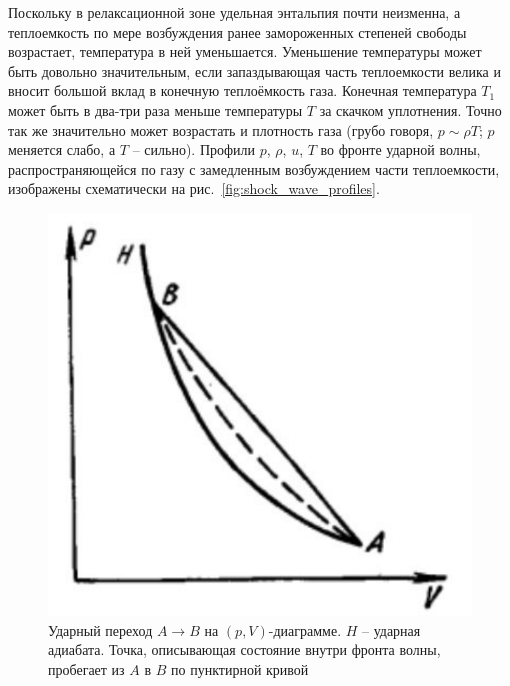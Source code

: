 \documentclass[10pt, a4paper]{article}
\begin{document}
Поскольку в релаксационной зоне удельная энтальпия почти неизменна, а теплоемкость по мере возбуждения ранее замороженных степеней свободы возрастает, температура в ней уменьшается. Уменьшение температуры может быть довольно значительным, если запаздывающая часть теплоемкости велика и вносит большой вклад в конечную теплоёмкость газа. Конечная температура $T_1$ может быть в два-три раза меньше температуры $T$ за скачком уплотнения. Точно так же значительно может возрастать и плотность газа (грубо говоря, $p \sim \rho T$; $p$ меняется слабо, а $T$ -- сильно). Профили $p$, $\rho$, $u$, $T$ во фронте ударной волны, распространяющейся по газу с замедленным возбуждением части теплоемкости, изображены схематически на рис.~\ref{fig:shock_wave_profiles}.

\begin{figure}[ht]
	\begin{center}
		\begin{minipage}[ht]{0.32\linewidth}
			\includegraphics[height=0.2\textheight]{shock_front}
			\caption{Ударный переход $A\rightarrow B$ на $(p, V)$-диаграмме. $H$ -- ударная адиабата. Точка, описывающая состояние внутри фронта волны, пробегает из $A$ в $B$ по пунктирной кривой~\cite{zeldovich}}
			\label{fig:shock_front} 
		\end{minipage}
		\hfill
		\begin{minipage}[ht]{0.32\linewidth}

\end{minipage}
\end{center}
\end{figure}
\end{document}
